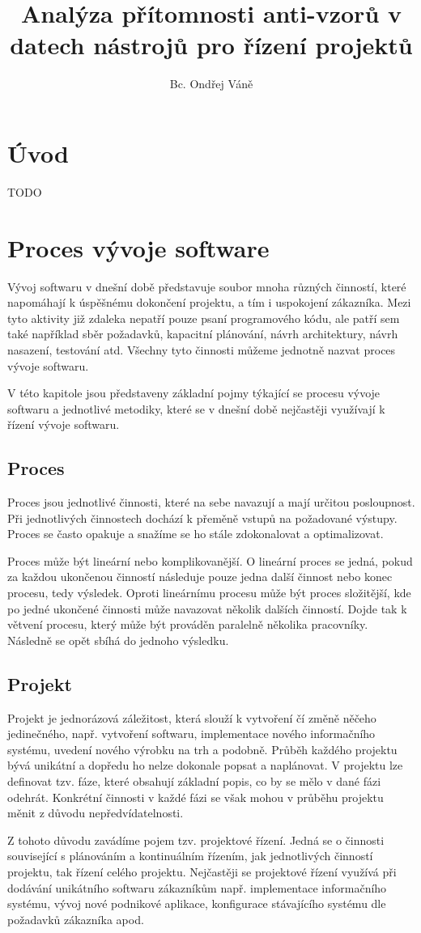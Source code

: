 \documentclass[czech,DP]{thesiskiv}
\author{Bc. Ondřej Váně}
\title{Analýza přítomnosti anti-vzorů v datech nástrojů pro řízení projektů}
\begin{document}
%
\maketitle
\tableofcontents
\chapter{Úvod}
TODO

\chapter{Proces vývoje software}
Vývoj softwaru v dnešní době představuje soubor mnoha různých činností, které napomáhají k úspěšnému dokončení projektu, a tím i uspokojení zákazníka. Mezi tyto aktivity již zdaleka nepatří pouze psaní programového kódu, ale patří sem také například sběr požadavků, kapacitní plánování, návrh architektury, návrh nasazení, testování atd. Všechny tyto činnosti můžeme jednotně nazvat proces vývoje softwaru.
\par
V této kapitole jsou představeny základní pojmy týkající se procesu vývoje softwaru a  jednotlivé metodiky, které se v dnešní době nejčastěji využívají k řízení vývoje softwaru.
\section{Proces}
Proces jsou jednotlivé činnosti, které na sebe navazují a mají určitou posloupnost. Při jednotlivých činnostech dochází k přeměně vstupů na požadované výstupy. Proces se často opakuje a snažíme se ho stále zdokonalovat a optimalizovat.
\par
Proces může být lineární nebo komplikovanější. O lineární proces se jedná, pokud za každou ukončenou činností následuje pouze jedna další činnost nebo konec procesu, tedy výsledek. Oproti lineárnímu procesu může být proces složitější, kde po jedné ukončené činnosti může navazovat několik dalších činností. Dojde tak k větvení procesu, který může být prováděn paralelně několika pracovníky. Následně se opět sbíhá do jednoho výsledku.\cite{ProjektVsProces}
\section{Projekt}
Projekt je jednorázová záležitost, která slouží k vytvoření čí změně něčeho jedinečného, např. vytvoření softwaru, implementace nového informačního systému, uvedení nového výrobku na trh a podobně. Průběh každého projektu bývá unikátní a dopředu ho nelze dokonale popsat a naplánovat. V projektu lze definovat tzv. fáze, které obsahují základní popis, co by se mělo v dané fázi odehrát. Konkrétní činnosti v každé fázi se však mohou v průběhu projektu měnit z důvodu nepředvídatelnosti.
\par
Z tohoto důvodu zavádíme pojem tzv. projektové řízení. Jedná se o činnosti související s plánováním a kontinuálním řízením, jak jednotlivých činností projektu, tak řízení celého projektu. Nejčastěji se projektové řízení využívá při dodávání unikátního softwaru zákazníkům např. implementace informačního systému, vývoj nové podnikové aplikace, konfigurace stávajícího systému dle požadavků zákazníka apod.\cite{ProcesniAProjektoveRizeni}
\end{document}
